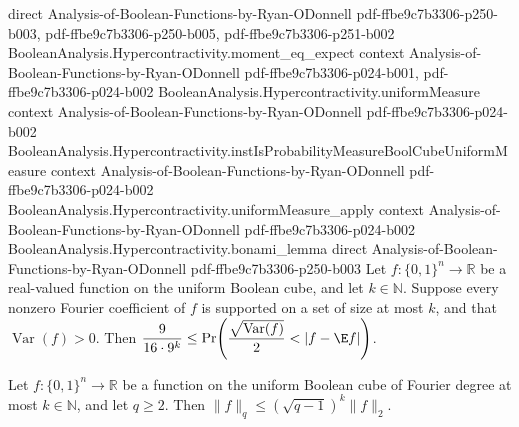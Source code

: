 \begin{theorem}
  {direct}
  {Analysis-of-Boolean-Functions-by-Ryan-ODonnell}
  {pdf-ffbe9c7b3306-p250-b003,
    pdf-ffbe9c7b3306-p250-b005,
    pdf-ffbe9c7b3306-p251-b002}
\proofstep
  {BooleanAnalysis.Hypercontractivity.moment_eq_expect}
  {context}
  {Analysis-of-Boolean-Functions-by-Ryan-ODonnell}
  {pdf-ffbe9c7b3306-p024-b001,
    pdf-ffbe9c7b3306-p024-b002}
\proofstep
  {BooleanAnalysis.Hypercontractivity.uniformMeasure}
  {context}
  {Analysis-of-Boolean-Functions-by-Ryan-ODonnell}
  {pdf-ffbe9c7b3306-p024-b002}
\proofstep
  {BooleanAnalysis.Hypercontractivity.instIsProbabilityMeasureBoolCubeUniformMeasure}
  {context}
  {Analysis-of-Boolean-Functions-by-Ryan-ODonnell}
  {pdf-ffbe9c7b3306-p024-b002}
\proofstep
  {BooleanAnalysis.Hypercontractivity.uniformMeasure_apply}
  {context}
  {Analysis-of-Boolean-Functions-by-Ryan-ODonnell}
  {pdf-ffbe9c7b3306-p024-b002}
\proofstep
  {BooleanAnalysis.Hypercontractivity.bonami_lemma}
  {direct}
  {Analysis-of-Boolean-Functions-by-Ryan-ODonnell}
  {pdf-ffbe9c7b3306-p250-b003}
Let $f:\{0,1\}^n\to\mathbb R$ be a real-valued function on the uniform Boolean cube, and
let $k\in\mathbb N$. Suppose every nonzero Fourier coefficient of $f$ is supported on a
set of size at most $k$, and that $\operatorname{Var}(f)>0$. Then $\dfrac{9}{16\cdot
9^k}\le \Pr\!\left(\dfrac{\sqrt{\operatorname{Var}(f)}}{2}<|f-\E f|\right)$.
\end{theorem}

\begin{theorem}
\leanok
{}
Let $f:\{0,1\}^n\to\mathbb R$ be a function on the uniform Boolean cube of Fourier degree at most $k\in\mathbb N$, and let $q\ge2$. Then $\|f\|_q\le(\sqrt{q-1})^k\|f\|_2$.
\end{theorem}

